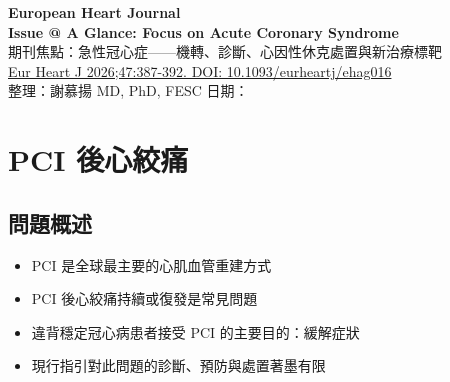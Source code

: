 \documentclass[12pt,a4paper]{article}
\begin{document}
\begin{center}
{\LARGE\bfseries\textcolor{emergency_red}{European Heart Journal}}\\[0.5cm]
{\Large\textbf{Issue @ A Glance: Focus on Acute Coronary Syndrome}}\\[0.3cm]
{\large 期刊焦點：急性冠心症——機轉、診斷、心因性休克處置與新治療標靶}\\[0.5cm]
{\normalsize \href{https://doi.org/10.1093/eurheartj/ehag016}{Eur Heart J 2026;47:387-392. DOI: 10.1093/eurheartj/ehag016}}\\[0.3cm]
{\normalsize 整理：謝慕揚 MD, PhD, FESC \quad 日期：\mydate}
\end{center}

\vspace{0.5cm}


\section{PCI 後心絞痛}

\subsection{問題概述}

\begin{itemize}
    \item PCI 是全球最主要的心肌血管重建方式
    \item PCI 後心絞痛持續或復發是常見問題
    \item 違背穩定冠心病患者接受 PCI 的主要目的：緩解症狀
    \item 現行指引對此問題的診斷、預防與處置著墨有限
\end{itemize}
\end{document}
